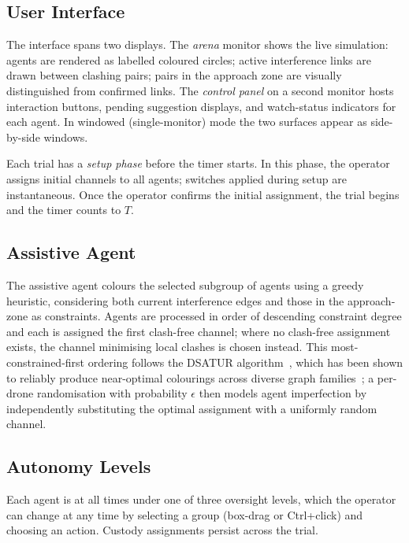 \documentclass[10pt]{article}
\theoremstyle{definition}
\begin{document}
\subsection{User Interface}\label{sec:ui}

The interface spans two displays.
The \emph{arena} monitor shows the live simulation: agents are rendered as labelled coloured circles; active interference links are drawn between clashing pairs; pairs in the approach zone are visually distinguished from confirmed links. The \emph{control panel} on a second monitor hosts interaction buttons, pending suggestion displays, and watch-status indicators for each agent. In windowed (single-monitor) mode the two surfaces appear as side-by-side windows.

Each trial has a \emph{setup phase} before the timer starts. In this phase, the operator assigns initial channels to all agents; switches applied during setup are instantaneous. Once the operator confirms the initial assignment, the trial begins and the timer counts to $T$.

\subsection{Assistive Agent}\label{sec:agent}
The assistive agent colours the selected subgroup of agents using a greedy heuristic, considering both current interference edges and those in the approach-zone as constraints. Agents are processed in order of descending constraint degree and each is assigned the first clash-free channel; where no clash-free assignment exists, the channel minimising local clashes is chosen instead. This most-constrained-first ordering follows the DSATUR algorithm~\cite{brelaz1979new}, which has been shown to reliably produce near-optimal colourings across diverse graph families~\cite{ouerfelli2011greedy}; a per-drone randomisation with probability $\epsilon$ then models agent imperfection by independently substituting the optimal assignment with a uniformly random channel.

\subsection{Autonomy Levels}\label{sec:modes}
Each agent is at all times under one of three oversight levels, which the operator can change at any time by selecting a group (box-drag or Ctrl+click) and choosing an action. Custody assignments persist across the trial.
\end{document}

